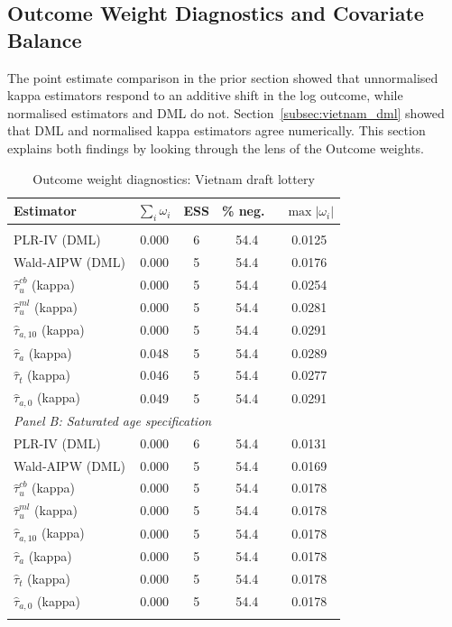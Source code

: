 \documentclass[12pt, a4paper, oneside]{article}
\theoremstyle{plain}
\theoremstyle{definition}
\begin{document}
\subsection{Outcome Weight Diagnostics and Covariate Balance}
\label{subsec:vietnam_weights}
The point estimate comparison in the prior section showed that unnormalised kappa estimators respond to an additive shift in the log outcome, while normalised estimators and DML do not. Section~\ref{subsec:vietnam_dml}
showed that DML and normalised kappa estimators agree numerically. This section
explains both findings by looking through the lens of the Outcome weights.
\begin{table}[htbp]
\centering
\caption{Outcome weight diagnostics: Vietnam draft lottery}
\label{tab:vietnam_weights}
\small
\begin{tabular}{l cccc}
\toprule
Estimator & $\sum_i\omega_i$ & ESS & \% neg.\ & $\max|\omega_i|$ \\
\midrule
\addlinespace[2pt]
\multicolumn{5}{l}{\textit{Panel A: Cubic age specification}} \\[2pt]
PLR-IV (DML)                      & 0.000 & 6 & 54.4 & 0.0125 \\
Wald-AIPW (DML)                   & 0.000 & 5 & 54.4 & 0.0176 \\
$\hat{\tau}_{u}^{cb}$ (kappa)     & 0.000 & 5 & 54.4 & 0.0254 \\
$\hat{\tau}_{u}^{ml}$ (kappa)     & 0.000 & 5 & 54.4 & 0.0281 \\
$\hat{\tau}_{a,10}$ (kappa)       & 0.000 & 5 & 54.4 & 0.0291 \\
$\hat{\tau}_{a}$ (kappa)          & 0.048 & 5 & 54.4 & 0.0289 \\
$\hat{\tau}_{t}$ (kappa)          & 0.046 & 5 & 54.4 & 0.0277 \\
$\hat{\tau}_{a,0}$ (kappa)        & 0.049 & 5 & 54.4 & 0.0291 \\[4pt]
\multicolumn{5}{l}{\textit{Panel B: Saturated age specification}} \\[2pt]
PLR-IV (DML)                      & 0.000 & 6 & 54.4 & 0.0131 \\
Wald-AIPW (DML)                   & 0.000 & 5 & 54.4 & 0.0169 \\
$\hat{\tau}_{u}^{cb}$ (kappa)     & 0.000 & 5 & 54.4 & 0.0178 \\
$\hat{\tau}_{u}^{ml}$ (kappa)     & 0.000 & 5 & 54.4 & 0.0178 \\
$\hat{\tau}_{a,10}$ (kappa)       & 0.000 & 5 & 54.4 & 0.0178 \\
$\hat{\tau}_{a}$ (kappa)          & 0.000 & 5 & 54.4 & 0.0178 \\
$\hat{\tau}_{t}$ (kappa)          & 0.000 & 5 & 54.4 & 0.0178 \\
$\hat{\tau}_{a,0}$ (kappa)        & 0.000 & 5 & 54.4 & 0.0178 \\
\bottomrule
\addlinespace[4pt]
\end{tabular}
\end{table}
\end{document}
